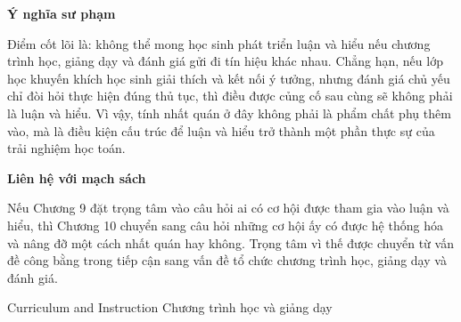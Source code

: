 {{    \textbf{Ý nghĩa sư phạm}\par\vspace*{\baselineskip}

    Điểm cốt lõi là: không thể mong học sinh phát triển luận và hiểu nếu chương trình học, giảng dạy và đánh giá gửi đi tín hiệu khác nhau. Chẳng hạn, nếu lớp học khuyến khích học sinh giải thích và kết nối ý tưởng, nhưng đánh giá chủ yếu chỉ đòi hỏi thực hiện đúng thủ tục, thì điều được củng cố sau cùng sẽ không phải là luận và hiểu. Vì vậy, tính nhất quán ở đây không phải là phẩm chất phụ thêm vào, mà là điều kiện cấu trúc để luận và hiểu trở thành một phần thực sự của trải nghiệm học toán.\par\vspace*{\baselineskip}

    \textbf{Liên hệ với mạch sách}\par\vspace*{\baselineskip}

    Nếu Chương 9 đặt trọng tâm vào câu hỏi ai có cơ hội được tham gia vào luận và hiểu, thì Chương 10 chuyển sang câu hỏi những cơ hội ấy có được hệ thống hóa và nâng đỡ một cách nhất quán hay không. Trọng tâm vì thế được chuyển từ vấn đề công bằng trong tiếp cận sang vấn đề tổ chức chương trình học, giảng dạy và đánh giá.}
  }

\TriPara
  {
  }
  {
  }{\NOTE{}}

\ParallelSection
  {Curriculum and Instruction}
  {Chương trình học và giảng dạy}
  {}

